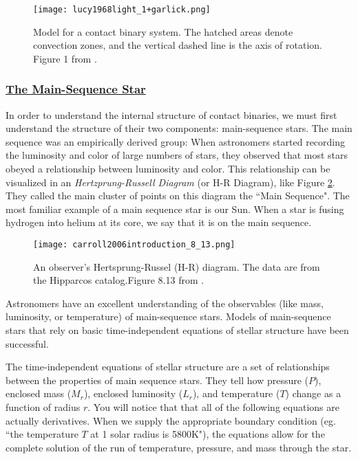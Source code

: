\documentclass[12pt]{article} %
\numberwithin{equation}{section} %
\begin{document}

\begin{figure}[H]
\centering
\texttt{[image: lucy1968light\_1+garlick.png]}
\caption{Model for a contact binary system. The hatched areas denote convection zones, and the vertical dashed line is the axis of rotation. Figure 1 from \citet{lucy1968light}.}
\label{fig: lucy1968light_1}
\end{figure}

\subsubsection[The Main-Sequence Star]{\hyperlink{toc}{The Main-Sequence Star}} \label{sec: The Main-Sequence Star}

In order to understand the internal structure of contact binaries, we must first understand the structure of their two components: main-sequence stars.  The main sequence was an empirically derived group: When astronomers started recording the luminosity and color of large numbers of stars, they observed that most stars obeyed a relationship between luminosity and color. This relationship can be visualized in an \emph{Hertzprung-Russell Diagram} (or H-R  Diagram), like Figure \ref{fig: carroll2006introduction_8_13}. They called the main cluster of points on this diagram the ``Main Sequence". The most familiar example of a main sequence star is our Sun. When a star is fusing hydrogen into helium at its core, we say that it is on the main sequence.

\begin{figure}[H]
\centering
\texttt{[image: carroll2006introduction\_8\_13.png]}
\caption{An observer's Hertsprung-Russel (H-R) diagram. The data are from the Hipparcos catalog.Figure 8.13 from \citet{carroll2006introduction}.}
\label{fig: carroll2006introduction_8_13}
\end{figure}

Astronomers have an excellent understanding of the observables (like mass, luminosity, or temperature) of main-sequence stars. Models of main-sequence stars that rely on basic time-independent equations of stellar structure have been successful.

The time-independent equations of stellar structure  are a set of relationships between the properties of main sequence stars. They tell how pressure ($P$), enclosed mass ($M_{r}$), enclosed luminosity ($L_{r}$), and temperature ($T$) change as a function of radius $r$. You will notice that that all of the following equations are actually derivatives. When we supply the appropriate boundary condition (eg. ``the temperature $T$ at 1 solar radius is 5800K"), the equations allow for the complete solution of the run of temperature, pressure, and mass through the star.
\end{document}
